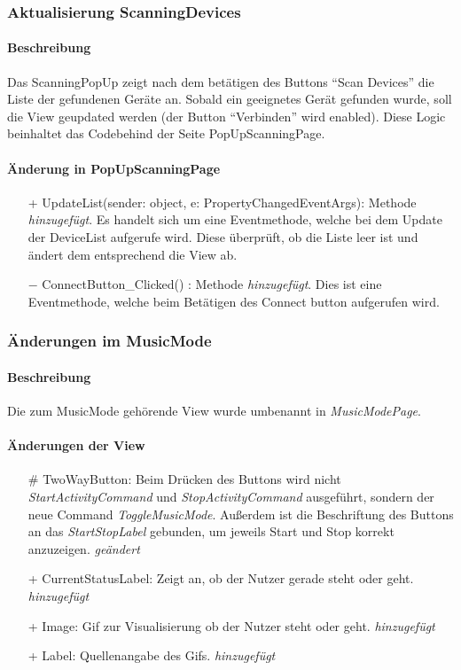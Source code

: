 \documentclass[a4paper,12pt]{article}
\begin{document}
\subsubsection{Aktualisierung ScanningDevices}
\paragraph{Beschreibung}
Das ScanningPopUp zeigt nach dem betätigen des Buttons ``Scan Devices'' die Liste der gefundenen Geräte an. Sobald ein geeignetes Gerät gefunden wurde, soll die View geupdated werden (der Button ``Verbinden'' wird enabled). Diese Logic beinhaltet das Codebehind der Seite PopUpScanningPage.

\paragraph{Änderung in PopUpScanningPage}
\begin{itemize}
	\item[+] UpdateList(sender: object, e: PropertyChangedEventArgs): Methode \textit{hinzugefügt}. Es handelt sich um eine Eventmethode, welche bei dem Update der DeviceList aufgerufe wird. Diese überprüft, ob die Liste leer ist und ändert dem entsprechend die View ab.
	\item[$-$] ConnectButton\_Clicked() : Methode \textit{hinzugefügt}. Dies ist eine Eventmethode, welche beim Betätigen des Connect button aufgerufen wird.
\end{itemize} 

\subsubsection{Änderungen im MusicMode}
\paragraph{Beschreibung}
Die zum MusicMode gehörende View wurde umbenannt in \textit{MusicModePage}.

\paragraph{Änderungen der View}
\begin{itemize}
	\item[\#] TwoWayButton: Beim Drücken des Buttons wird nicht
			\textit{StartActivityCommand} und \textit{StopActivityCommand}
			ausgeführt, sondern der neue Command \textit{ToggleMusicMode}.
			Außerdem ist die Beschriftung des Buttons an das \textit{StartStopLabel}
			gebunden, um jeweils \glqq{}Start\grqq{} und \glqq{}Stop\grqq{} korrekt anzuzeigen. \textit{geändert}
	\item[+] CurrentStatusLabel: Zeigt an, ob der Nutzer gerade steht oder geht. \textit{hinzugefügt}
	\item[+] Image: Gif zur Visualisierung ob der Nutzer steht oder geht. \textit{hinzugefügt}
	\item[+] Label: Quellenangabe des Gifs. \textit{hinzugefügt}
\end{itemize}
\end{document}
